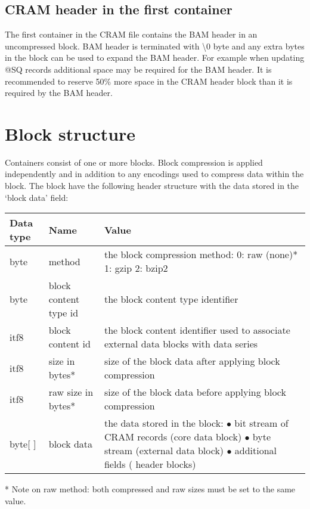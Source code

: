 \documentclass[a4paper]{article}
\begin{document}
\subsection{\textbf{CRAM header in the first container}}

The first container in the CRAM file contains the BAM header in an uncompressed 
block.  BAM header is terminated with \textbackslash{}0 byte and any extra bytes 
in the block can be used to expand the BAM header. For example when updating @SQ 
records additional space may be required for the BAM header. It is recommended 
to reserve 50\% more space in the CRAM header block than it is required by the 
BAM header.

\section{\textbf{Block structure}}

Containers consist of one or more blocks. Block compression is applied independently 
and in addition to any encodings used to compress data within the block. The block 
have the following header structure with the data stored in the `block data' field:

\begin{tabular}{|l|>{\raggedright}p{120pt}|>{\raggedright}p{260pt}|}
\hline
\textbf{Data type} & \textbf{Name} & \textbf{Value}
\tabularnewline
\hline
byte & method & the block compression method: \linebreak{}
0: raw (none)*\linebreak{}
1: gzip\linebreak{}
2: bzip2\tabularnewline
\hline
byte & block content type id & the block content type identifier\tabularnewline
\hline
itf8 & block content id & the block content identifier used to associate external 
data blocks with data series\tabularnewline
\hline
itf8 & size in bytes* & size of the block data after applying block compression\tabularnewline
\hline
itf8 & raw size in bytes* & size of the block data before applying block compression\tabularnewline
\hline
byte[ ] & block data & the data stored in the block:\linebreak{}
$\bullet$ bit stream of CRAM records (core data block)\linebreak{}
$\bullet$ byte stream (external data block)\linebreak{}
$\bullet$ additional fields ( header blocks)\tabularnewline
\hline
\end{tabular}

* Note on raw method: both compressed and raw sizes must be set to the same value.
\end{document}
